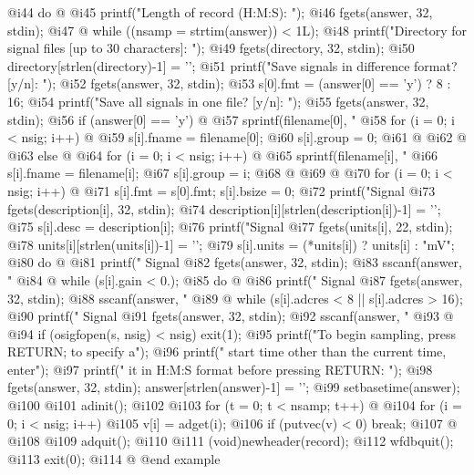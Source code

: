 {{{{{{{{{{ @i{44}      do @{
 @i{45}          printf("Length of record (H:M:S): ");
 @i{46}          fgets(answer, 32, stdin);
 @i{47}      @} while ((nsamp = strtim(answer)) < 1L);
 @i{48}      printf("Directory for signal files [up to 30 characters]: ");
 @i{49}      fgets(directory, 32, stdin);
 @i{50}      directory[strlen(directory)-1] = '\0';
 @i{51}      printf("Save signals in difference format? [y/n]: ");
 @i{52}      fgets(answer, 32, stdin);
 @i{53}      s[0].fmt = (answer[0] == 'y') ? 8 : 16;
 @i{54}      printf("Save all signals in one file? [y/n]: ");
 @i{55}      fgets(answer, 32, stdin);
 @i{56}      if (answer[0] == 'y') @{
 @i{57}          sprintf(filename[0], "%
 @i{58}          for (i = 0; i < nsig; i++) @{
 @i{59}               s[i].fname = filename[0];
 @i{60}               s[i].group = 0;
 @i{61}          @}
 @i{62}      @}
 @i{63}      else @{
 @i{64}          for (i = 0; i < nsig; i++) @{
 @i{65}               sprintf(filename[i], "%
 @i{66}               s[i].fname = filename[i];
 @i{67}               s[i].group = i;
 @i{68}          @}
 @i{69}      @}
 @i{70}      for (i = 0; i < nsig; i++) @{
 @i{71}          s[i].fmt = s[0].fmt; s[i].bsize = 0;
 @i{72}          printf("Signal %
 @i{73}          fgets(description[i], 32, stdin);
 @i{74}          description[i][strlen(description[i])-1] = '\0';
 @i{75}          s[i].desc = description[i];
 @i{76}          printf("Signal %
 @i{77}          fgets(units[i], 22, stdin);
 @i{78}          units[i][strlen(units[i])-1] = '\0';
 @i{79}          s[i].units = (*units[i]) ? units[i] : "mV";
 @i{80}          do @{
 @i{81}              printf(" Signal %
 @i{82}              fgets(answer, 32, stdin);
 @i{83}              sscanf(answer, "%
 @i{84}          @} while (s[i].gain < 0.);
 @i{85}          do @{
 @i{86}              printf(" Signal %
 @i{87}              fgets(answer, 32, stdin);
 @i{88}              sscanf(answer, "%
 @i{89}          @} while (s[i].adcres < 8 || s[i].adcres > 16);
 @i{90}          printf(" Signal %
 @i{91}          fgets(answer, 32, stdin);
 @i{92}          sscanf(answer, "%
 @i{93}      @}
 @i{94}      if (osigfopen(s, nsig) < nsig) exit(1);
 @i{95}      printf("To begin sampling, press RETURN;  to specify a\n");
 @i{96}      printf(" start time other than the current time, enter\n");
 @i{97}      printf(" it in H:M:S format before pressing RETURN: ");
 @i{98}      fgets(answer, 32, stdin); answer[strlen(answer)-1] = '\0';
 @i{99}      setbasetime(answer);
@i{100}  
@i{101}      adinit();
@i{102}  
@i{103}      for (t = 0; t < nsamp; t++) @{
@i{104}          for (i = 0; i < nsig; i++)
@i{105}              v[i] = adget(i);
@i{106}          if (putvec(v) < 0) break;
@i{107}      @}
@i{108}  
@i{109}      adquit();
@i{110}  
@i{111}      (void)newheader(record);
@i{112}      wfdbquit();
@i{113}      exit(0);
@i{114}  @}
@end example

}}}}}}}}}
